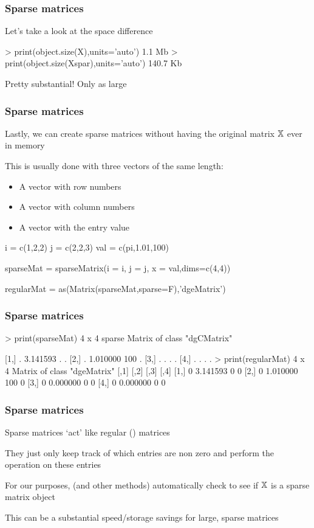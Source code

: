 \documentclass{beamer}
\begin{document}
\begin{frame}[fragile]
\frametitle{Sparse matrices}
Let's take a look at the space difference
\begin{blockcode}
> print(object.size(X),units='auto')
1.1 Mb
> print(object.size(Xspar),units='auto')
140.7 Kb
\end{blockcode}

\vsp
Pretty substantial!  Only  as large
\end{frame}

\begin{frame}[fragile]
\frametitle{Sparse matrices}
Lastly, we can create sparse matrices without having the original matrix $\mathbb{X}$ ever in memory

\vsp
This is usually done with three vectors of the same length:
\begin{itemize}
\item A vector with row numbers
\item A vector with column numbers
\item A vector with the entry value
\end{itemize}
\begin{blockcode}
i = c(1,2,2)
j = c(2,2,3)
val = c(pi,1.01,100)

sparseMat = sparseMatrix(i = i, j = j, x = val,dims=c(4,4))

regularMat = as(Matrix(sparseMat,sparse=F),'dgeMatrix')
\end{blockcode}
\end{frame}


\begin{frame}[fragile]
\frametitle{Sparse matrices}
\begin{blockcode}
> print(sparseMat)
4 x 4 sparse Matrix of class "dgCMatrix"
                     
[1,] . 3.141593   . .
[2,] . 1.010000 100 .
[3,] . .          . .
[4,] . .          . .
> print(regularMat)
4 x 4 Matrix of class "dgeMatrix"
     [,1]     [,2] [,3] [,4]
[1,]    0 3.141593    0    0
[2,]    0 1.010000  100    0
[3,]    0 0.000000    0    0
[4,]    0 0.000000    0    0
\end{blockcode}
\end{frame}


\begin{frame}[fragile]
\frametitle{Sparse matrices}
Sparse matrices `act' like regular () matrices

\vsp
They just only keep track of which entries are non zero and perform the
operation on these entries

\vsp
For our purposes,  (and other methods) automatically check to see if $\mathbb{X}$ is 
a sparse matrix object

\vsp
This can be a substantial speed/storage savings for large, sparse matrices
\end{frame}
\end{document}
